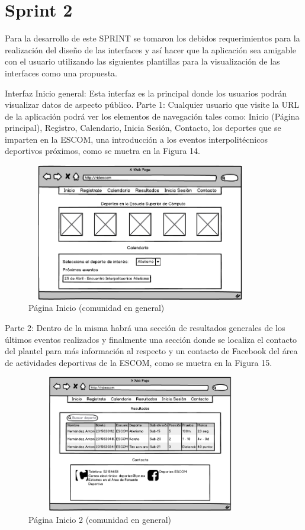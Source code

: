 	
	\section{Sprint 2}
	Para la desarrollo de este SPRINT se tomaron los debidos requerimientos para la realización del diseño de las interfaces y así hacer que la aplicación sea amigable con el usuario utilizando las siguientes plantillas para la visualización de las interfaces como una propuesta.
	
	Interfaz Inicio general: Esta interfaz es la principal donde los usuarios podrán visualizar datos de aspecto público. \newline
	Parte 1:
	Cualquier usuario que visite la URL de la aplicación podrá ver los elementos de navegación tales como: Inicio (Página principal), Registro, Calendario, Inicia Sesión, Contacto, los deportes que se imparten en la ESCOM, una introducción a los eventos interpolitécnicos deportivos próximos, como se muetra en la Figura 14. 
	\begin{figure}[hbt!]
		\centering
		\includegraphics[width=10cm, height=6cm]{Imagenes/Disenos/Iniciogeneral.png}
		\caption{Página Inicio (comunidad en general)}
	\end{figure}
	Parte 2:
	Dentro de la misma habrá una sección de resultados generales de los últimos eventos realizados y finalmente una  sección donde se localiza el contacto del plantel para más información al respecto y un contacto de Facebook del área de actividades deportivas de la ESCOM, como se muetra en la Figura 15.
	\begin{figure}[hbt!]
		\centering
		\includegraphics[width=10cm, height=6cm]{Imagenes/Disenos/Iniciogeneral1.png}
		\caption{Página Inicio 2 (comunidad en general)}
	\end{figure}
	\newline
	
